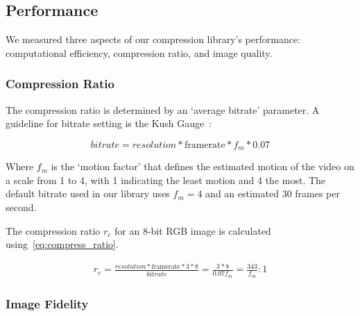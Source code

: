\documentclass[review]{vgtc}                 %
\begin{document}

\subsection{Performance}

We measured three aspects of our compression library's performance:
computational efficiency, compression ratio, and image quality.

\subsubsection{Compression Ratio}



The compression ratio is determined by an `average bitrate' parameter.
A guideline for bitrate setting is the Kush
Gauge~\cite{iszaidyinvestigation}:

\begin{equation}
\label{eq:bitrate}
 bitrate = resolution * \text{framerate} * f_m * 0.07 
\end{equation}

Where \(f_m\) is the `motion factor' that defines the estimated motion
of the video on a scale from 1 to 4, with 1 indicating the least motion
and 4 the most. The default bitrate used in our library uses \(f_m=4\)
and an estimated 30 frames per second.

The compression ratio \(r_c\) for an 8-bit RGB image is calculated
using~\cref{eq:compress_ratio}.

\begin{multline}
 r_c = \frac{ resolution * \text{framerate} * 3 * 8}{ bitrate} = \frac{3*8}{0.07f_m} = \frac{343}{f_m} : 1
\label{eq:compress_ratio}
\end{multline}

\subsubsection{Image Fidelity}
\end{document}
